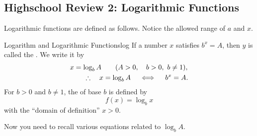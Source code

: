 \documentclass[11pt,pdfa,lastpage]{MishoNote}
\newcommand\starskip{\bigskip\begin{center}\pgfornament[width=7cm]{88}\end{center}\medskip}
\begin{document}
\subsection{Highschool Review 2: Logarithmic Functions}
Logarithmic functions are defined as follows. Notice the allowed range of $a$ and $x$.
\begin{definition}{Logarithm and Logarithmic Functions}{log}
  If a number $x$ satisfies $b^x=A$, then $y$ is called the . We write it by
  \begin{align}
    &\notag x=\log_b A\qquad(A>0,\quad b>0,~b\neq 1),\\
    &\qquad \therefore \quad x=\log_b A\quad\iff\quad b^x=A.
  \end{align}
  For $b>0$ and $b\neq 1$, the  of base $b$ is defined by
  \[f(x)=\log_b x\]
  with the ``domain of definition'' $x>0$.
\end{definition}
Now you need to recall various equations related to $\log_b A$.


\starskip
\end{document}
